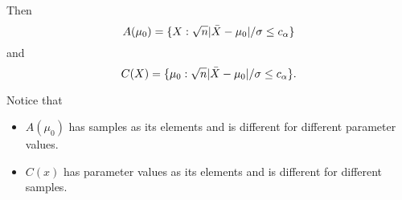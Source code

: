 \begin{itemize}[leftmargin=0pt]
\begin{ex}
    Then
    \begin{equation*}
      A(\mu_0) = \{X : \sqrt{n} |\bar{X} - \mu_0| / \sigma \leq c_\alpha\}
    \end{equation*}
    and
    \begin{equation*}
      C(X) = \{\mu_0 : \sqrt{n} |\bar{X} - \mu_0| / \sigma \leq c_\alpha\}.
    \end{equation*}
  \end{ex}

  Notice that
  \begin{itemize}
  \item $A(\mu_0)$ has samples as its elements and is different for
    different parameter values.
  \item $C(x)$ has parameter values as its elements and is different
    for different samples.
  \end{itemize}

\end{itemize}

